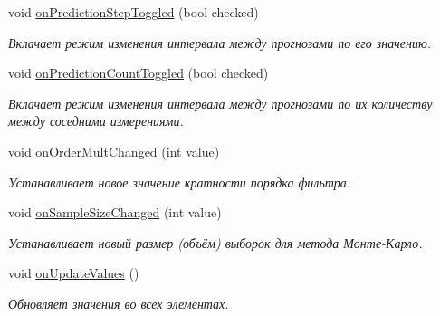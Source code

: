 \begin{DoxyCompactItemize}
void \hyperlink{class_filter_parameters_widget_aa5168232b5731eafd599c451fd9a54f9}{on\+Prediction\+Step\+Toggled} (bool checked)
\begin{DoxyCompactList}\small\item\em Вклачает режим изменения интервала между прогнозами по его значению. \end{DoxyCompactList}\item 
void \hyperlink{class_filter_parameters_widget_af00a1550252f080c7647f3fbf684587b}{on\+Prediction\+Count\+Toggled} (bool checked)
\begin{DoxyCompactList}\small\item\em Вклачает режим изменения интервала между прогнозами по их количеству между соседними измерениями. \end{DoxyCompactList}\item 
void \hyperlink{class_filter_parameters_widget_adacd531098565f7b21bd8d958a35fa74}{on\+Order\+Mult\+Changed} (int value)
\begin{DoxyCompactList}\small\item\em Устанавливает новое значение кратности порядка фильтра. \end{DoxyCompactList}\item 
void \hyperlink{class_filter_parameters_widget_afc9adb2c97bb297c29a86c2e9ee123b5}{on\+Sample\+Size\+Changed} (int value)
\begin{DoxyCompactList}\small\item\em Устанавливает новый размер (объём) выборок для метода Монте-\/Карло. \end{DoxyCompactList}\item 
void \hyperlink{class_filter_parameters_widget_ad952425cf2dabf76a2f28d19caa2641f}{on\+Update\+Values} ()
\begin{DoxyCompactList}\small\item\em Обновляет значения во всех элементах. \end{DoxyCompactList}\end{DoxyCompactItemize}
